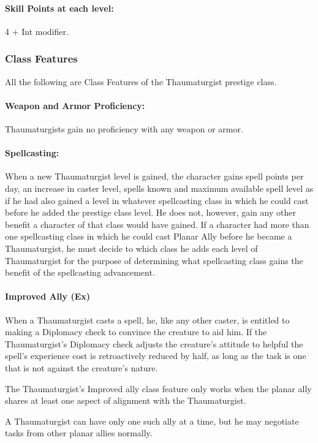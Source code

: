 \paragraph{Skill Points at each level:} 4 + Int modifier.
\subsubsection{Class Features}
All the following are Class Features of the Thaumaturgist prestige class.

\paragraph{Weapon and Armor Proficiency:} Thaumaturgists gain no proficiency with any weapon or armor.

\paragraph{Spellcasting:} When a new Thaumaturgist level is gained, the character gains spell points per day, an increase in caster level, spells known and maximum available spell level as if he had also gained a level in whatever spellcasting class in which he could cast  before he added the prestige class level. 
He does not, however, gain any other benefit a character of that class would have gained. 
If a character had more than one spellcasting class in which he could cast Planar Ally before he became a Thaumaturgist, he must decide to which class he adds each level of Thaumaturgist for the purpose of determining what spellcasting class gains the benefit of the spellcasting advancement.

\paragraph{Improved Ally (Ex)}
When a Thaumaturgist casts a  spell, he, like any other caster, is entitled to making a Diplomacy check to convince the creature to aid him. If the Thaumaturgist's Diplomacy check adjusts the creature's attitude to helpful the spell's experience cost is retroactively reduced by half, as long as the task is one that is not against the creature's nature.

The Thaumaturgist's Improved ally class feature only works when the planar ally shares at least one aspect of alignment with the Thaumaturgist.

A Thaumaturgist can have only one such ally at a time, but he may negotiate tasks from other planar allies normally.

